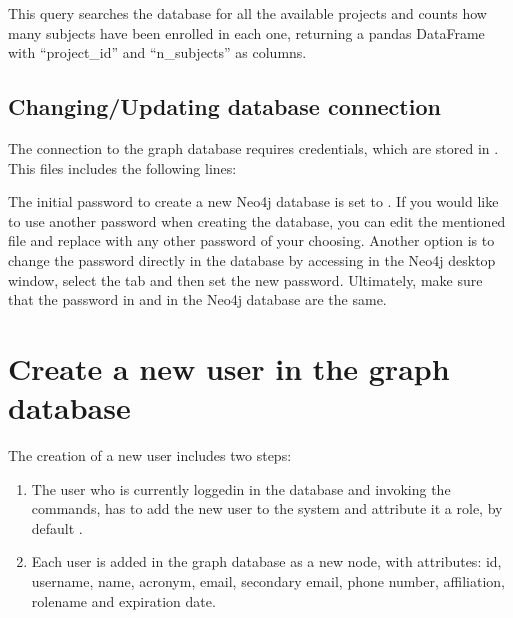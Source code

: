 \documentclass[letterpaper,10pt,english]{sphinxmanual}
\begin{document}
This query searches the database for all the available projects and counts how many subjects have been enrolled in each one, returning a pandas DataFrame with “project\_id” and “n\_subjects” as columns.


\subsection{Changing/Updating database connection}
\label{\detokenize{getting_started/connect-to-ckg:changing-updating-database-connection}}
The connection to the graph database requires credentials, which are stored in .
This files includes the following lines:

\begin{sphinxVerbatim}[commandchars=\\\{\}]
 
  
 
 
\end{sphinxVerbatim}

The initial password to create a new Neo4j database is set to . If you would like to use another password when creating the database, you can edit the mentioned file and replace  with any other password of your choosing.
Another option is to change the password directly in the database by accessing  in the Neo4j desktop window, select the tab  and then set the new password.
Ultimately, make sure that the password in  and in the Neo4j database are the same.


\section{Create a new user in the graph database}
\label{\detokenize{getting_started/create-new-user:create-a-new-user-in-the-graph-database}}\label{\detokenize{getting_started/create-new-user::doc}}
The creation of a new user includes two steps:
\begin{enumerate}
%
\item {} 
The user who is currently logged\sphinxhyphen{}in in the database and invoking the commands, has to add the new user to the system and attribute it a role, by default .

\item {} 
Each user is added in the graph database as a new  node, with attributes: id, username, name, acronym, email, secondary email, phone number, affiliation, rolename and expiration date.

\end{enumerate}
\end{document}
